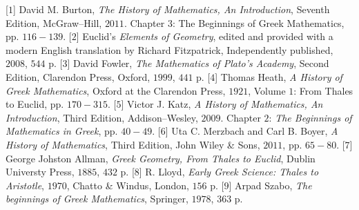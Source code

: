 \begin{multicols}{2}
		\vskip 0.1cm
		[$1$] David M. Burton, \textit{The History of Mathematics, An Introduction}, Seventh Edition, McGraw--Hill, $2011$. Chapter $3$: The Beginnings of Greek Mathematics, pp. $116-139$.
		\vskip 0.1cm
		[$2$] Euclid’s \textit{Elements of Geometry}, edited and provided with a modern English translation by Richard Fitzpatrick, Independently published, $2008$, $544$ p.
		\vskip 0.1cm
		[$3$] David Fowler, \textit{The Mathematics of Plato’s Academy}, Second Edition, Clarendon Press, Oxford, $1999$, $441$ p.
		\vskip 0.1cm   
		[$4$] Thomas Heath, \textit{A History of Greek Mathematics}, Oxford at the Clarendon Press, $1921$, Volume $1$: From Thales to Euclid, pp. $170-315$.
		\vskip 0.1cm   
		[$5$] Victor J. Katz, \textit{A History of Mathematics, An Introduction}, Third Edition, Addison--Wesley, $2009$. Chapter $2$: \textit{The Beginnings of Mathematics in Greek}, pp. $40-49$.
		\vskip 0.1cm
		[$6$] Uta C. Merzbach and Carl B. Boyer, \textit{A
			History of Mathematics}, Third Edition, John Wiley \& Sons, $2011$, pp. $65-80$.
		\vskip 0.1cm
		[$7$] George Johston Allman, \textit{Greek Geometry, From Thales to Euclid}, Dublin Universty Press, $1885$, $432$ p.
		\vskip 0.1cm  
		[$8$] R. Lloyd, \textit{Early Greek Science: Thales to Aristotle}, $1970$, Chatto \& Windus, London, $156$ p.
		\vskip 0.1cm 
		[$9$] Arpad Szabo, \textit{The beginnings of Greek Mathematics}, Springer, $1978$, $363$ p.
\end{multicols}